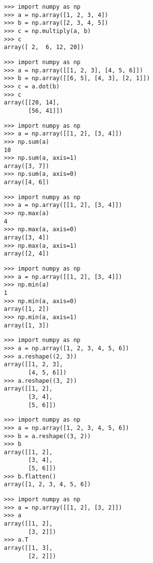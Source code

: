 \begin{verbatim}
>>> import numpy as np
>>> a = np.array([1, 2, 3, 4])
>>> b = np.array([2, 3, 4, 5])
>>> c = np.multiply(a, b)
>>> c
array([ 2,  6, 12, 20])
\end{verbatim}

\begin{verbatim}
>>> import numpy as np
>>> a = np.array([[1, 2, 3], [4, 5, 6]])
>>> b = np.array([[6, 5], [4, 3], [2, 1]])
>>> c = a.dot(b)
>>> c
array([[20, 14],
       [56, 41]])
\end{verbatim}

\begin{verbatim}
>>> import numpy as np
>>> a = np.array([[1, 2], [3, 4]])
>>> np.sum(a)
10
>>> np.sum(a, axis=1)
array([3, 7])
>>> np.sum(a, axis=0)
array([4, 6])
\end{verbatim}

\begin{verbatim}
>>> import numpy as np
>>> a = np.array([[1, 2], [3, 4]])
>>> np.max(a)
4
>>> np.max(a, axis=0)
array([3, 4])
>>> np.max(a, axis=1)
array([2, 4])
\end{verbatim}

\begin{verbatim}
>>> import numpy as np
>>> a = np.array([[1, 2], [3, 4]])
>>> np.min(a)
1
>>> np.min(a, axis=0)
array([1, 2])
>>> np.min(a, axis=1)
array([1, 3])
\end{verbatim}

\begin{verbatim}
>>> import numpy as np
>>> a = np.array([1, 2, 3, 4, 5, 6])
>>> a.reshape((2, 3))
array([[1, 2, 3],
       [4, 5, 6]])
>>> a.reshape((3, 2))
array([[1, 2],
       [3, 4],
       [5, 6]])
\end{verbatim}

\begin{verbatim}
>>> import numpy as np
>>> a = np.array([1, 2, 3, 4, 5, 6])
>>> b = a.reshape((3, 2))
>>> b
array([[1, 2],
       [3, 4],
       [5, 6]])
>>> b.flatten()
array([1, 2, 3, 4, 5, 6])
\end{verbatim}

\begin{verbatim}
>>> import numpy as np
>>> a = np.array([[1, 2], [3, 2]])
>>> a
array([[1, 2],
       [3, 2]])
>>> a.T
array([[1, 3],
       [2, 2]])
\end{verbatim}


